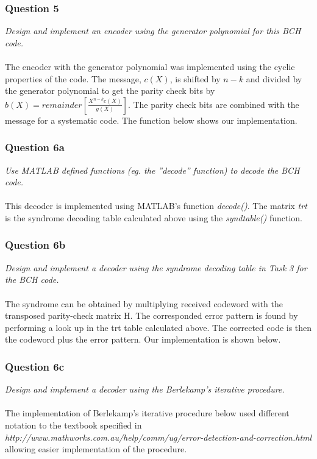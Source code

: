 \documentclass[a4paper]{article}
\begin{document}
\subsubsection{Question 5} \textit{Design and implement an encoder using the generator polynomial for this BCH code.} \\
\\
The encoder with the generator polynomial was implemented using the cyclic properties of the code. The message, $c(X)$, is shifted by $n-k$ and divided by the generator polynomial to get the parity check bits by $b(X) = remainder[\frac{X^{n-k}c(X)}{g(X)}]$. The parity check bits are combined with the message for a systematic code. The function below shows our implementation.



\subsubsection{Question 6a} \textit{Use MATLAB defined functions (eg. the ”decode” function) to decode the BCH code.}\\
\\
This decoder is implemented using MATLAB’s function \textit{decode()}. The matrix \textit{trt} is the syndrome decoding table calculated above using the \textit{syndtable()} function.



\subsubsection{Question 6b} \textit{Design and implement a decoder using the syndrome decoding table in Task 3 for the BCH code.}\\
\\
The syndrome can be obtained by multiplying received codeword with the transposed parity-check matrix H. The corresponded error pattern is found by performing a look up in the trt table calculated above. The corrected code is then the codeword plus the error pattern. Our implementation is shown below.



\subsubsection{Question 6c} \textit{Design and implement a decoder using the Berlekamp’s iterative procedure.}\\
\\
The implementation of Berlekamp's iterative procedure below used different notation to the textbook specified in \textit{http://www.mathworks.com.au/help/comm/ug/error-detection-and-correction.html} allowing easier implementation of the procedure.
\end{document}
